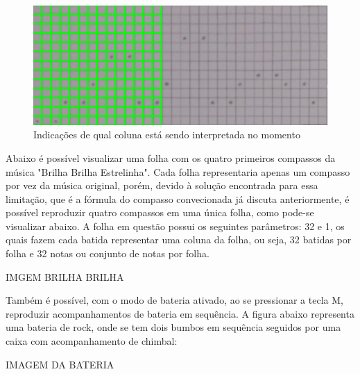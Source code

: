 \documentclass[12pt]{report}
\begin{document}
\begin{figure}[H]
  \centering
  \includegraphics[width=1\textwidth]{imagens/area_transformada_preenchida.png}
  \caption{Indicações de qual coluna está sendo interpretada no momento}
  \label{fig:colunas_marcacoes}
\end{figure}

Abaixo é possível visualizar uma folha com os quatro primeiros compassos da música "Brilha Brilha Estrelinha". Cada folha representaria apenas um compasso por vez da música original, porém, devido à solução encontrada para essa limitação, que é a fórmula do compasso convecionada já discuta anteriormente, é possível reproduzir quatro compassos em uma única folha, como pode-se visualizar abaixo. A folha em questão possui os seguintes parâmetros: 32 e 1, os quais fazem cada batida representar uma coluna da folha, ou seja, 32 batidas por folha e 32 notas ou conjunto de notas por folha.

IMGEM BRILHA BRILHA

Também é possível, com o modo de bateria ativado, ao se pressionar a tecla M, reproduzir acompanhamentos de bateria em sequência. A figura abaixo representa uma bateria de rock, onde se tem dois bumbos em sequência seguidos por uma caixa com acompanhamento de chimbal:

IMAGEM DA BATERIA



\end{document}

